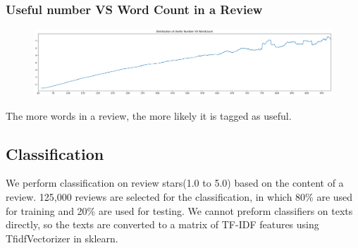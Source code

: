 \documentclass[12pt]{article}
\begin{document}
\subsubsection{Useful number VS Word Count in a Review}
\begin{figure}[H]
\begin{center}
    \includegraphics[width=1.0\textwidth]{../05_dataMining/distributionUsefulWordCount.png}
\end{center}
\end{figure}
The more words in a review, the more likely it is tagged as useful.
\subsection{Classification}
We perform classification on review stars(1.0 to 5.0) based on the content of a review. 125,000 reviews are selected for the classification, in which 80\% are used for training and 20\% are used for testing. We cannot preform classifiers on texts directly, so the texts are converted to a matrix of TF-IDF features using TfidfVectorizer in sklearn.
\end{document}
